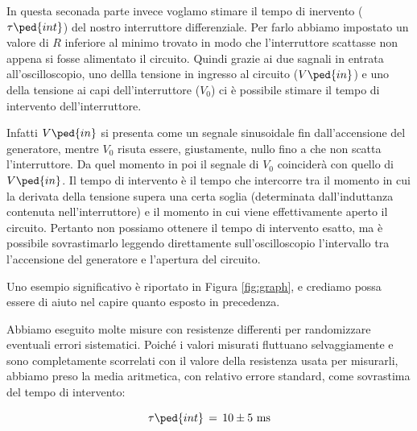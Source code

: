 In questa seconada parte invece voglamo stimare il tempo di inervento ($\tau\ped{int}$) del nostro interruttore differenziale. Per farlo abbiamo impostato un valore di $R$ inferiore al minimo trovato in modo che l'interruttore scattasse non appena si fosse alimentato il circuito. Quindi grazie ai due sagnali in entrata all'oscilloscopio, uno dellla tensione in ingresso al circuito ($V\ped{in}$) e uno della tensione ai capi dell'interruttore ($V_0$) ci è possibile stimare il tempo di intervento dell'interruttore.

Infatti $V\ped{in}$ si presenta come un segnale sinusoidale fin dall'accensione del generatore, mentre $V_0$ risuta essere, giustamente, nullo fino a che non scatta l'interruttore. Da quel momento in poi il segnale di $V_0$ coinciderà con quello di $V\ped{in}$. Il tempo di intervento
è il tempo che intercorre tra il momento in cui la derivata della tensione supera una certa soglia (determinata dall'induttanza contenuta nell'interruttore) e il momento in cui viene effettivamente aperto il circuito. Pertanto non possiamo ottenere il tempo di intervento esatto, ma è possibile sovrastimarlo leggendo direttamente sull'oscilloscopio l'intervallo tra l'accensione del generatore e l'apertura del circuito.

Uno esempio significativo è riportato in Figura \ref{fig:graph}, e crediamo possa essere di aiuto nel capire quanto esposto in precedenza.

Abbiamo eseguito molte misure con resistenze differenti per randomizzare eventuali errori sistematici. Poiché i valori misurati fluttuano
selvaggiamente e sono completamente scorrelati con il valore della resistenza usata per misurarli, abbiamo preso la media aritmetica,
con relativo errore standard, come sovrastima del tempo di intervento:

\begin{equation*}
    \tau\ped{int} \,=\, 10 \pm 5  ~ \si{\milli\second}
\end{equation*}

